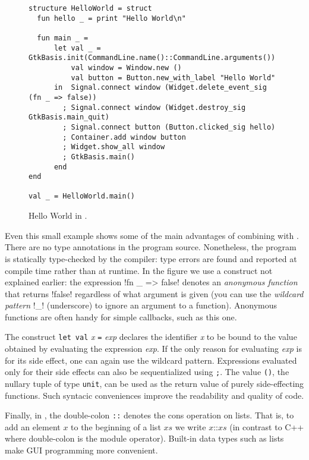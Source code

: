 \documentclass[finalversion]{usetex-v1}
\begin{document}
\begin{figure*}[htp]
\begin{centering}
\begin{verbatim}
structure HelloWorld = struct
  fun hello _ = print "Hello World\n"

  fun main _ =
      let val _ = GtkBasis.init(CommandLine.name()::CommandLine.arguments())
          val window = Window.new ()
          val button = Button.new_with_label "Hello World"
      in  Signal.connect window (Widget.delete_event_sig (fn _ => false))
        ; Signal.connect window (Widget.destroy_sig GtkBasis.main_quit)
        ; Signal.connect button (Button.clicked_sig hello)
        ; Container.add window button
        ; Widget.show_all window
        ; GtkBasis.main() 
      end
end

val _ = HelloWorld.main()
\end{verbatim}
\caption{Hello World in \mgtk.\label{fig:hello-world}}
\end{centering}
\end{figure*}

Even this small example shows some of the main advantages of
combining \sml with \gtk.  There are no type annotations
in the program source. Nonetheless, the program is statically type-checked by
the compiler: type errors are found and reported at compile time
rather than at runtime.  In the figure we use a \sml construct
not explained earlier: the expression !fn _ => false!  denotes an
\emph{anonymous function} that returns !false! regardless of what
argument is given (you can use the \emph{wildcard pattern} !_!
(underscore) to ignore an argument to a function).
Anonymous functions are often handy for simple
callbacks, such as this one.

The construct \texttt{let}~\texttt{val}
\textit{x} \texttt{=} \textit{exp} declares the identifier \textit{x}
to be bound to the value obtained by evaluating the expression
\textit{exp}.  If the only reason for evaluating \textit{exp} is for
its side effect, one can again use the wildcard pattern.
Expressions evaluated only for their side effects can also be
sequentialized using \texttt{;}.  The value \texttt{()}, the nullary
tuple of type \texttt{unit}, can be used as the return value of purely
side-effecting functions.
Such syntacic conveniences improve the readability and
quality of code.

Finally, in \sml, the double-colon \texttt{::}
denotes the cons operation on lists.  That is, to add an element $x$
to the beginning of a list $\mathit{xs}$ we write $x \texttt{::}
\mathit{xs}$ (in contrast to C++ where double-colon is the module operator).  
Built-in data types such as lists make GUI programming more convenient.
\end{document}
